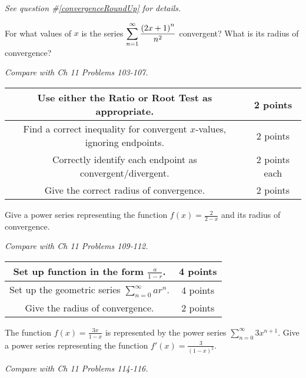 \documentclass[12pt]{exam}
\newcommand{\ds}{\ensuremath{\displaystyle}}
\begin{document}
\begin{questions}
\textit{See question \#\ref{convergenceRoundUp} for details.}

\vfill

\newpage

\question[10]
For what values of $x$ is the series
$\ds \sum_{n=1}^{\infty} \frac{\left(2x+1\right)^n}{n^2}$ convergent?
What is its radius of convergence?

\textit{Compare with Ch 11 Problems 103-107.}

\begin{center}
  \begin{tabular}{|c|c|}
    \hline
    Use either the Ratio or Root Test as appropriate. & 2 points \\
    \hline
    Find a correct inequality for convergent $x$-values,
    ignoring endpoints. & 2 points \\
    \hline
    Correctly identify each endpoint as convergent/divergent. & 2 points each \\
    \hline
    Give the correct radius of convergence. & 2 points \\
    \hline
  \end{tabular}
\end{center}

\vfill

\newpage

\question[10]
Give a power series representing the function $f(x)=\frac{2}{2-x}$ and
its radius of convergence.

\textit{Compare with Ch 11 Problems 109-112.}

\begin{center}
  \begin{tabular}{|c|c|}
    \hline
    Set up function in the form $\frac{a}{1-r}$. & 4 points \\
    \hline
    Set up the geometric series $\sum_{n=0}^\infty ar^n$. & 4 points \\
    \hline
    Give the radius of convergence. & 2 points \\
    \hline
  \end{tabular}
\end{center}

\vfill

\newpage

\question[10]
The function $f(x)=\frac{3x}{1-x}$ is represented by the power series
$\sum_{n=0}^\infty 3x^{n+1}$. Give a power series representing the function
$f'(x)=\frac{3}{(1-x)^2}$.

\textit{Compare with Ch 11 Problems 114-116.}


\end{questions}
\end{document}
